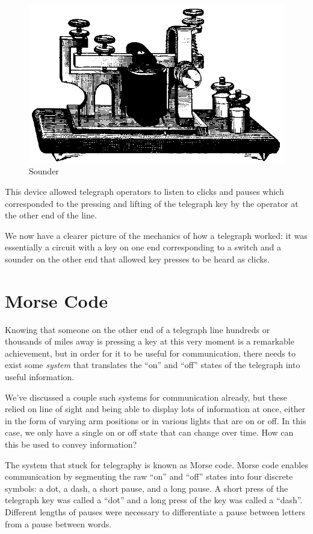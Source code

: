 \documentclass[UTF8]{book}
\begin{document}
\begin{CJK}{UTF8}{gbsn}
\begin{figure}[H]
\centering
\includegraphics[width=0.6\linewidth]{telegraphsounder}
\caption{Sounder}
\end{figure}


This device allowed telegraph operators to listen to clicks and pauses which corresponded to the pressing and lifting of the telegraph key by the operator at the other end of the line.

We now have a clearer picture of the mechanics of how a telegraph worked: it was essentially a circuit with a key on one end corresponding to a switch and a sounder on the other end that allowed key presses to be heard as clicks.

\section{Morse Code}

Knowing that someone on the other end of a telegraph line hundreds or thousands of miles away is pressing a key at this very moment is a remarkable achievement, but in order for it to be useful for communication, there needs to exist some \emph{system} that translates the ``on'' and ``off'' states of the telegraph into useful information.

We've discussed a couple such systems for communication already, but these relied on line of sight and being able to display lots of information at once, either in the form of varying arm positions or in various lights that are on or off. In this case, we only have a single on or off state that can change over time. How can this be used to convey information?

The system that stuck for telegraphy is known as Morse code. Morse code enables communication by segmenting the raw ``on'' and ``off'' states into four discrete symbols: a dot, a dash, a short pause, and a long pause. A short press of the telegraph key was called a ``dot'' and a long press of the key was called a ``dash''. Different lengths of pauses were necessary to differentiate a pause between letters from a pause between words.


\end{CJK}
\end{document}
